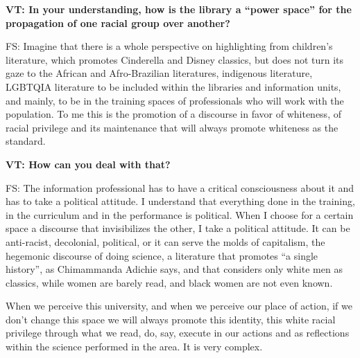 \documentclass[a4paper,
fontsize=11pt,
oneside,
numbers=noperiodatend,
parskip=half-,
bibliography=totoc,
final
]{scrartcl}
\begin{document}
\textbf{VT: In your understanding, how is the library a \enquote{power
space} for the propagation of one racial group over another?}

FS: Imagine that there is a whole perspective on highlighting from
children's literature, which promotes Cinderella and Disney classics,
but does not turn its gaze to the African and Afro-Brazilian
literatures, indigenous literature, LGBTQIA literature to be included
within the libraries and information units, and mainly, to be in the
training spaces of professionals who will work with the population. To
me this is the promotion of a discourse in favor of whiteness, of racial
privilege and its maintenance that will always promote whiteness as the
standard.

\textbf{VT: How can you deal with that?}

FS: The information professional has to have a critical consciousness
about it and has to take a political attitude. I understand that
everything done in the training, in the curriculum and in the
performance is political. When I choose for a certain space a discourse
that invisibilizes the other, I take a political attitude. It can be
anti-racist, decolonial, political, or it can serve the molds of
capitalism, the hegemonic discourse of doing science, a literature that
promotes \enquote{a single history}, as Chimammanda Adichie says, and
that considers only white men as classics, while women are barely read,
and black women are not even known.

When we perceive this university, and when we perceive our place of
action, if we don't change this space we will always promote this
identity, this white racial privilege through what we read, do, say,
execute in our actions and as reflections within the science performed
in the area. It is very complex.
\end{document}
